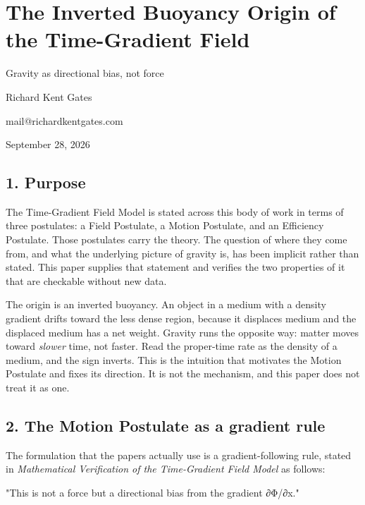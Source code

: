 \documentclass[
  10pt,
]{article}
\author{}
\date{}
\begin{document}
\hypertarget{the-inverted-buoyancy-origin-of-the-time-gradient-field}{%
\section{The Inverted Buoyancy Origin of the Time-Gradient
Field}\label{the-inverted-buoyancy-origin-of-the-time-gradient-field}}

Gravity as directional bias, not force

Richard Kent Gates

mail@richardkentgates.com

September 28, 2026

\hypertarget{purpose}{%
\subsection{1. Purpose}\label{purpose}}

The Time-Gradient Field Model is stated across this body of work in
terms of three postulates: a Field Postulate, a Motion Postulate, and an
Efficiency Postulate. Those postulates carry the theory. The question of
where they come from, and what the underlying picture of gravity is, has
been implicit rather than stated. This paper supplies that statement and
verifies the two properties of it that are checkable without new data.

The origin is an inverted buoyancy. An object in a medium with a density
gradient drifts toward the less dense region, because it displaces
medium and the displaced medium has a net weight. Gravity runs the
opposite way: matter moves toward \emph{slower} time, not faster. Read
the proper-time rate as the density of a medium, and the sign inverts.
This is the intuition that motivates the Motion Postulate and fixes its
direction. It is not the mechanism, and this paper does not treat it as
one.

\hypertarget{the-motion-postulate-as-a-gradient-rule}{%
\subsection{2. The Motion Postulate as a gradient
rule}\label{the-motion-postulate-as-a-gradient-rule}}

The formulation that the papers actually use is a gradient-following
rule, stated in \emph{Mathematical Verification of the Time-Gradient
Field Model} as follows:

"This is not a force but a directional bias from the gradient ∂Φ/∂x."
\end{document}
